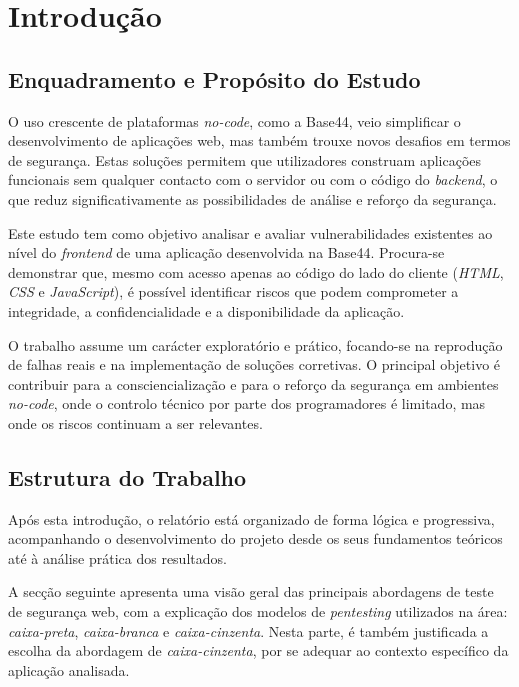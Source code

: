\section{Introdução}

\subsection{Enquadramento e Propósito do Estudo}

O uso crescente de plataformas \textit{no-code}, como a Base44, veio simplificar o desenvolvimento de aplicações web, mas também trouxe novos desafios em termos de segurança. Estas soluções permitem que utilizadores construam aplicações funcionais sem qualquer contacto com o servidor ou com o código do \textit{backend}, o que reduz significativamente as possibilidades de análise e reforço da segurança.

Este estudo tem como objetivo analisar e avaliar vulnerabilidades existentes ao nível do \textit{frontend} de uma aplicação desenvolvida na Base44. Procura-se demonstrar que, mesmo com acesso apenas ao código do lado do cliente (\textit{HTML}, \textit{CSS} e \textit{JavaScript}), é possível identificar riscos que podem comprometer a integridade, a confidencialidade e a disponibilidade da aplicação.

O trabalho assume um carácter exploratório e prático, focando-se na reprodução de falhas reais e na implementação de soluções corretivas. O principal objetivo é contribuir para a consciencialização e para o reforço da segurança em ambientes \textit{no-code}, onde o controlo técnico por parte dos programadores é limitado, mas onde os riscos continuam a ser relevantes.

\subsection{Estrutura do Trabalho}

Após esta introdução, o relatório está organizado de forma lógica e progressiva, acompanhando o desenvolvimento do projeto desde os seus fundamentos teóricos até à análise prática dos resultados.

A secção seguinte apresenta uma visão geral das principais abordagens de teste de segurança web, com a explicação dos modelos de \textit{pentesting} utilizados na área: \textit{caixa-preta}, \textit{caixa-branca} e \textit{caixa-cinzenta}. Nesta parte, é também justificada a escolha da abordagem de \textit{caixa-cinzenta}, por se adequar ao contexto específico da aplicação analisada.

